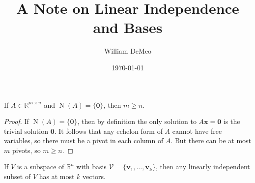 \documentclass{article}
\title{A Note on Linear Independence and Bases}
\author{William DeMeo}
\date{\today}
\newcommand{\R}{\ensuremath{\mathbb{R}}}
\newcommand{\vN}{\ensuremath{\operatorname{N}}}
\newcommand{\sV}{\ensuremath{\mathcal{V}}}
\newcommand{\vx}{\ensuremath{\mathbf{x}}}
\newcommand{\vzero}{\ensuremath{\mathbf{0}}}
\begin{document}
\maketitle

If $A \in \R^{m\times n}$ and $\vN(A)= \{\vzero\}$, then
$m\geq n$.
\begin{proof}
If $\vN(A)= \{\vzero\}$, then by definition the only solution to
$A \vx = \vzero$ is the trivial solution $\vzero$.  It follows that
any echelon form of $A$ cannot have free variables, so there must be a pivot
in each column of $A$.  But there can be at most $m$ pivots, so $m\geq n$.
\end{proof}

If $V$ is a subspace of $\R^n$ with basis 
$\sV = \{\mathbf{v}_1,\dots, \mathbf{v}_k\}$, then
any linearly independent subset of $V$ has at most $k$ vectors.
\end{document}
